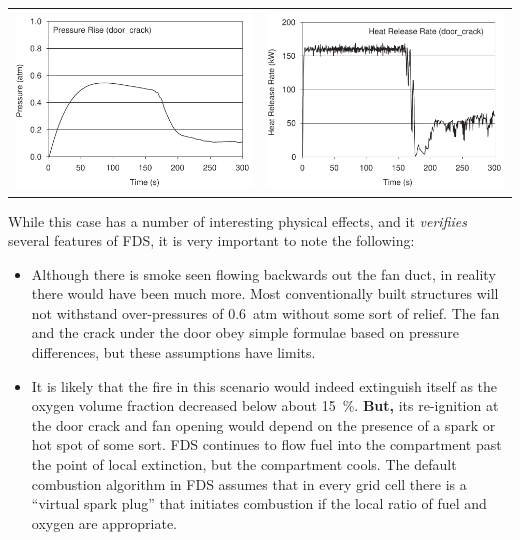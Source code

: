 \documentclass[11pt]{book}
\begin{document}
\vspace{0.1in}
\noindent
\begin{tabular*}{\textwidth}{lr}
\includegraphics[width=3.1in]{FIGURES/door_crack_Pressure} &
\includegraphics[width=3.1in]{FIGURES/door_crack_HRR}
\end{tabular*}

While this case has a number of interesting physical effects, and it {\em verifiies} several features of FDS, it is very important to note the following:
\begin{itemize}
\item Although there is smoke seen flowing backwards out the fan duct, in reality there would have been much more. Most conventionally built structures will not withstand over-pressures
of 0.6~atm without some sort of relief. The fan and the crack under the door obey simple formulae based on pressure differences, but these assumptions have limits.
\item It is likely that the fire in this scenario would indeed extinguish itself as the oxygen volume fraction decreased below about 15~\%. {\bf But,} its re-ignition at the door crack
and fan opening would depend on the presence of a spark or hot spot of some sort. FDS continues to flow fuel into the compartment past the point of local extinction, but the compartment
cools. The default combustion algorithm in FDS assumes that in every grid cell there is a ``virtual spark plug'' that initiates combustion if the local ratio of fuel and oxygen are
appropriate.
\end{itemize}
\end{document}

